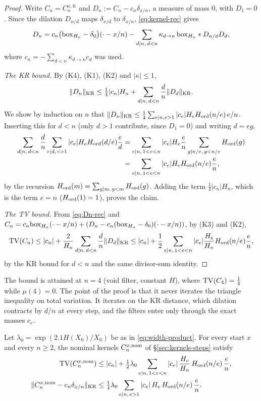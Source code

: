 \begin{proof}
Write $C_n=C_n^{x,\mathrm{fr}}$ and $D_n:=C_n-c_n\delta_{x/n}$, a measure of mass $0$, with $D_1=0$. Since the dilation
$D_{n/d}$ maps $\delta_{x/d}$ to $\delta_{x/n}$, \eqref{eq:kernel-rec} gives
\begin{equation}\label{eq:Dn-rec}
  D_n=c_n\bigl(\mathrm{box}_{H_n}-\delta_0\bigr)(\cdot-x/n)-\sum_{d\mid n,\,d<n}\kappa_{d\to n}\,\mathrm{box}_{H_n}*D_{n/d}D_d ,
\end{equation}
where $c_n=-\sum_{d<n}\kappa_{d\to n}c_d$ was used.

\emph{The KR bound.} By (K4), (K1), (K2) and $|\kappa|\le1$,
\[
  \lVert D_n\rVert_{\mathrm{KR}}\le\tfrac14|c_n|H_n+\sum_{d\mid n,\,d<n}\frac dn\lVert D_d\rVert_{\mathrm{KR}}.
\]
We show by induction on $n$ that $\lVert D_n\rVert_{\mathrm{KR}}\le\frac14\sum_{e\mid n,e>1}|c_e|H_eH_{\mathrm{ord}}(n/e)\,e/n$. Inserting this for $d<n$
(only $d>1$ contribute, since $D_1=0$) and writing $d=eg$,
\[
\begin{aligned}
  \sum_{d\mid n,\,d<n}\frac dn\sum_{e\mid d,\,e>1}|c_e|H_eH_{\mathrm{ord}}(d/e)\frac ed
  &=\sum_{e\mid n,\,1<e<n}|c_e|H_e\frac en\sum_{g\mid n/e,\,g<n/e}H_{\mathrm{ord}}(g)\\
  &=\sum_{e\mid n,\,1<e<n}|c_e|H_eH_{\mathrm{ord}}(n/e)\frac en,
\end{aligned}
\]
by the recursion $H_{\mathrm{ord}}(m)=\sum_{g\mid m,\,g<m}H_{\mathrm{ord}}(g)$. Adding the term $\frac14|c_n|H_n$, which is the term $e=n$
($H_{\mathrm{ord}}(1)=1$), proves the claim.

\emph{The TV bound.} From \eqref{eq:Dn-rec} and $C_n=c_n\mathrm{box}_{H_n}(\cdot-x/n)+(D_n-c_n(\mathrm{box}_{H_n}-\delta_0)(\cdot-x/n))$, by (K3)
and (K2),
\[
  \operatorname{TV}(C_n)\le|c_n|+\frac2{H_n}\sum_{d\mid n,\,d<n}\frac dn\lVert D_d\rVert_{\mathrm{KR}}\le|c_n|+\frac12\sum_{e\mid n,\,1<e<n}|c_e|\frac{H_e}{H_n}H_{\mathrm{ord}}(n/e)\frac en,
\]
by the KR bound for $d<n$ and the same divisor-sum identity.
\end{proof}

The bound is attained at $n=4$ (void filter, constant $H$), where $\operatorname{TV}(C_4)=\frac14$ while $\mu(4)=0$. The point of the proof is
that it never iterates the triangle inequality on total variation. It iterates on the KR distance, which dilation contracts
by $d/n$ at every step, and the filters enter only through the exact masses $c_e$.

\begin{theorem}\label{thm:kr-random}
Let $\lambda_0=\exp(2.1H(X_0)/X_0)$ be as in \eqref{eq:width-product}. For every start $x$ and every $n\ge2$, the nominal kernels
$C_n^{x,\mathrm{nom}}$ of \S\ref{sec:kernels-steps} satisfy
\begin{align*}
  \operatorname{TV}(C_n^{x,\mathrm{nom}})&\le|c_n|+\tfrac12\lambda_0\sum_{e\mid n,\,1<e<n}|c_e|\,\frac{H_e}{H_n}\,H_{\mathrm{ord}}(n/e)\,\frac en,\\
  \lVert C_n^{x,\mathrm{nom}}-c_n\delta_{x/n}\rVert_{\mathrm{KR}}&\le\tfrac14\lambda_0\sum_{e\mid n,\,e>1}|c_e|\,H_e\,H_{\mathrm{ord}}(n/e)\,\frac en .
\end{align*}
\end{theorem}

